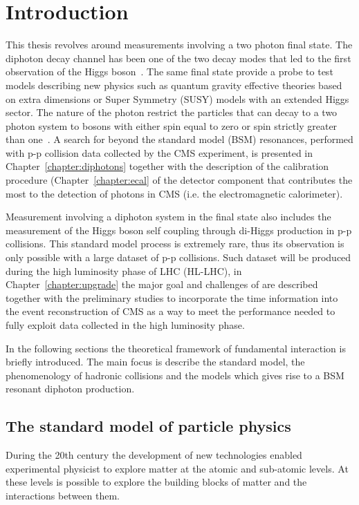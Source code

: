 \chapter{Introduction}
\label{sec:introduction}

This thesis revolves around measurements involving a two photon final state.
The diphoton decay channel has been one of the two decay modes that led to the
first observation of the Higgs boson~\cite{cms_atlas_hgg_comb}. The same
final state provide a probe to test models describing new physics such as quantum gravity
effective theories based on extra dimensions or Super Symmetry (SUSY) models with an extended
Higgs sector. The nature of the photon restrict the
particles that can decay to a two photon system to bosons with either
spin equal to zero or spin strictly greater than one~\cite{landau,yang}.
A search for beyond the standard model (BSM) resonances, performed with p-p collision data collected by the CMS experiment,
is presented in Chapter~\ref{chapter:diphotons} together with the description of the calibration procedure (Chapter~\ref{chapter:ecal}
of the detector component that contributes the most to the detection of photons in CMS (i.e. the electromagnetic calorimeter).

Measurement involving a diphoton system in the final state also includes the measurement of the Higgs boson self coupling
through di-Higgs production in p-p collisions. This standard model process is extremely rare, thus its observation is
only possible with a large dataset of p-p collisions. Such dataset will be produced during the high luminosity
phase of LHC (HL-LHC), in Chapter~\ref{chapter:upgrade} the major goal and challenges of are described together with
the preliminary studies to incorporate the time information into the event reconstruction of CMS as a way to meet
the performance needed to fully exploit data collected in the high luminosity phase.

In the following sections the theoretical framework of fundamental interaction is briefly introduced.
The main focus is describe the standard model, the phenomenology of hadronic collisions and the models
which gives rise to a BSM resonant diphoton production.

\section{The standard model of particle physics}
During the 20th century the development of new technologies enabled experimental
physicist to explore matter at the atomic and sub-atomic levels. At these levels
is possible to explore the building blocks of matter and the interactions between them.

